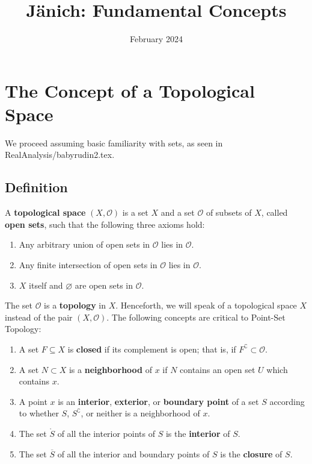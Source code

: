 \documentclass[11pt]{article}
\title{Jänich: Fundamental Concepts}
\author{February 2024}
\renewcommand{\O}{\mathcal{O}}
\begin{document}
\maketitle
\tableofcontents
\newpage


\section{The Concept of a Topological Space}

We proceed assuming basic familiarity with sets, as seen in RealAnalysis/babyrudin2.tex.


\subsection{Definition}

A \textbf{topological space} $(X, \O)$ is a set $X$ and a set $\O$ of subsets of $X$, called \textbf{open sets}, such that the following three axioms hold:
\begin{enumerate}
  \item Any arbitrary union of open sets in $\O$ lies in $\O$.
  \item Any finite intersection of open sets in $\O$ lies in $\O$.
  \item $X$ itself and $\varnothing$ are open sets in $\O$.
\end{enumerate}
The set $\O$ is a \textbf{topology} in $X$. Henceforth, we will speak of a topological space $X$ instead of the pair $(X, \O)$. The following concepts are critical to Point-Set Topology:
\begin{enumerate}
  \item A set $F \subseteq X$ is \textbf{closed} if its complement is open; that is, if $F^{\complement} \subset \O$.
  \item A set $N \subset X$ is a \textbf{neighborhood} of $x$ if $N$ contains an open set $U$ which contains $x$.
  \item A point $x$ is an \textbf{interior}, \textbf{exterior}, or \textbf{boundary point} of a set $S$ according to whether $S$, $S^{\complement}$, or neither is a neighborhood of $x$.
  \item The set $\mathring{S}$ of all the interior points of $S$ is the \textbf{interior} of $S$.
  \item The set $\overline{S}$ of all the interior and boundary points of $S$ is the \textbf{closure} of $S$.
\end{enumerate}
\end{document}
